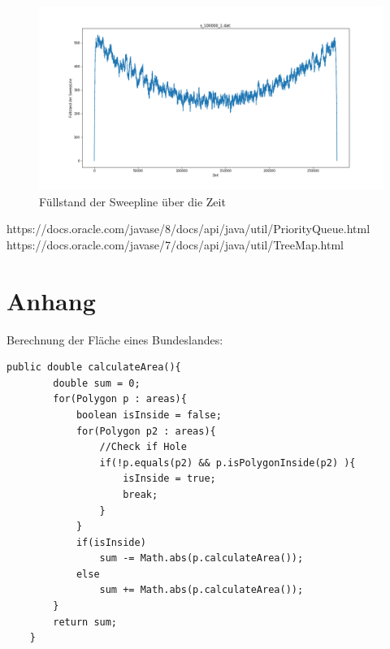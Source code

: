 \documentclass[conference]{IEEEtran}
\begin{document}
\begin{figure}[!tbp]
\begin{minipage}[b]{0.5\textwidth}
		\end{minipage}
			\hfill
		\begin{minipage}[b]{0.5\textwidth}
			\includegraphics[width=\textwidth]{s100000+1.png}
		\end{minipage}
		\caption{Füllstand der Sweepline über die Zeit}
		\label{fullstand}
	\end{figure}
	
	\begin{thebibliography}{00}
		https://docs.oracle.com/javase/8/docs/api/java/util/PriorityQueue.html
		https://docs.oracle.com/javase/7/docs/api/java/util/TreeMap.html
	\end{thebibliography}
	
	
	
	\section{Anhang}

	Berechnung der Fläche eines Bundeslandes:
	\begin{lstlisting}[basicstyle=\tiny]
	public double calculateArea(){
		double sum = 0;
		for(Polygon p : areas){
			boolean isInside = false;
			for(Polygon p2 : areas){
				//Check if Hole
				if(!p.equals(p2) && p.isPolygonInside(p2) ){ 
					isInside = true;
					break;
				}   
			}
			if(isInside)
				sum -= Math.abs(p.calculateArea());
			else
				sum += Math.abs(p.calculateArea());
		}
		return sum;
	}
	\end{lstlisting}	
\end{document}
